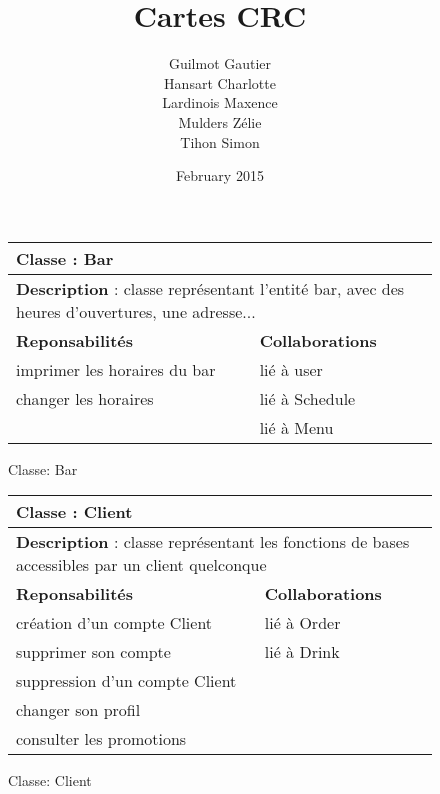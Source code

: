 \documentclass{article}
\title{Cartes CRC}
\author{Guilmot Gautier \\ Hansart Charlotte \\ Lardinois Maxence \\ Mulders Zélie \\ Tihon Simon  }
\date{February 2015}
\begin{document}
\maketitle
\newpage

\begin{figure}
\begin{tabular}{|p{7cm}|p{7cm}|}
\hline
 \multicolumn{2}{|p{12cm}|}{\textbf{Classe} : Bar }
   \\
 \hline
  \multicolumn{2}{|p{12cm}|}{ \textbf{Description} :  classe représentant l'entité bar, avec des heures d'ouvertures, une adresse...}
\\
 \hline
 \textbf{Reponsabilités} & \textbf{Collaborations} \\
 \hline
imprimer les horaires du bar & lié à user\\
changer les horaires & lié à Schedule \\
 & lié à Menu \\


  \hline
\end{tabular}
\caption{Classe: Bar}
\label{tab:bar}
\end{figure}


\begin{figure}
\begin{tabular}{|p{7cm}|p{7cm}|}
\hline
 \multicolumn{2}{|p{12cm}|}{\textbf{Classe} : Client }
   \\
 \hline
  \multicolumn{2}{|p{12cm}|}{ \textbf{Description} : classe représentant les fonctions de bases accessibles par un client quelconque }
\\
 \hline
 \textbf{Reponsabilités} & \textbf{Collaborations} \\
 \hline
 création d'un compte Client & lié à Order \\
 supprimer son compte & lié à Drink \\
 suppression d'un compte Client & \\
 changer son profil & \\
 consulter les promotions & \\
  \hline
\end{tabular}
\caption{Classe: Client}
\label{tab:client}
\end{figure}
\end{document}
